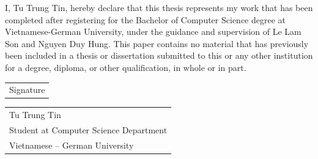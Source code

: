 I, Tu Trung Tin, hereby declare that this thesis represents my work that has been completed after registering for the Bachelor of Computer Science degree at Vietnamese-German University, under the guidance and supervision of Le Lam Son and Nguyen Duy Hung. This paper contains no material that has previously been included in a thesis or dissertation submitted to this or any other institution for a degree, diploma, or other qualification, in whole or in part.

\begin{flushright}
    \begin{tabular}{m{7cm}}
        \centering Signature
    \end{tabular}
\end{flushright}

\vspace*{4em}
\begin{flushright}
    \begin{tabular}{m{7cm}}
        \centering Tu Trung Tin \\
        Student at Computer Science Department \\
        Vietnamese – German University
    \end{tabular}
\end{flushright}